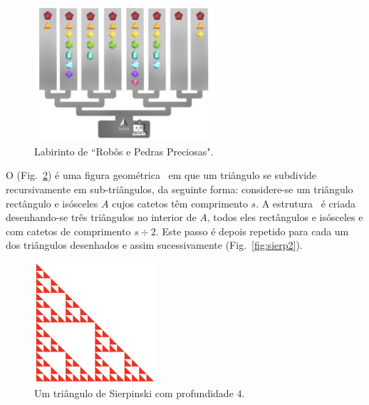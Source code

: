 \documentclass[a4paper]{article}
\newcommand{\Conid}[1]{\mathit{#1}}
\newcommand{\Varid}[1]{\mathit{#1}}
\begin{document}
\begin{figure}
	\centering
	\includegraphics[width=0.6\textwidth]{cp2122t_media/castor11.png}
\caption{
   Labirinto de ``Robôs e Pedras Preciosas".
   \label{fig:labirinto}
}
\end{figure}

\Problema

O  (Fig.~\ref{fig:sierp1}) é uma figura geométrica
\fractal\ em que um triângulo se subdivide recursivamente em sub-triângulos,
da seguinte forma: considere-se um triângulo rectângulo e
isósceles \ensuremath{\Conid{A}} cujos catetos têm comprimento \ensuremath{\Varid{s}}. A estrutura \fractal\ é
criada desenhando-se três triângulos no interior de \ensuremath{\Conid{A}}, todos eles
rectângulos e isósceles e com catetos de comprimento \ensuremath{\Varid{s}\div \mathrm{2}}. Este passo
é depois repetido para cada um dos triângulos desenhados e assim
sucessivamente (Fig.~\ref{fig:sierp2}).

\begin{figure}[htb]
\begin{center}
	\includegraphics[width=0.4\textwidth]{cp2122t_media/sierpinski1.png}
\end{center}
  \caption{Um triângulo de Sierpinski com profundidade \ensuremath{\mathrm{4}}.}
  \label{fig:sierp1}
\end{figure}
\end{document}
